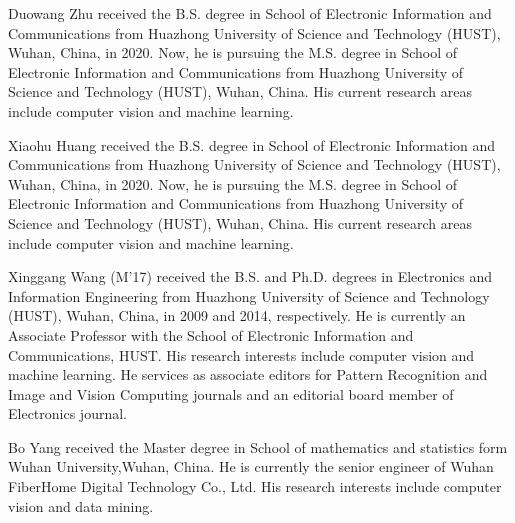 \documentclass[journal]{IEEEtran}
\begin{document}
{\small


}

\begin{IEEEbiography}{Duowang Zhu} received the B.S. degree in School of Electronic Information and Communications from Huazhong University of Science and Technology (HUST), Wuhan, China, in 2020. Now, he is pursuing the M.S. degree in School of Electronic Information and Communications from Huazhong University of Science and Technology (HUST), Wuhan, China. His current research areas include computer vision and machine learning.
\end{IEEEbiography}

\begin{IEEEbiography} {Xiaohu Huang} received the B.S. degree in School of Electronic Information and Communications from Huazhong University of Science and Technology (HUST), Wuhan, China, in 2020. Now, he is pursuing the M.S. degree in School of Electronic Information and Communications from Huazhong University of Science and Technology (HUST), Wuhan, China. His current research areas include computer vision and machine learning.
\end{IEEEbiography}

\begin{IEEEbiography} {Xinggang Wang (M’17)} received the B.S. and Ph.D. degrees in Electronics and Information Engineering from Huazhong University of Science and Technology (HUST), Wuhan, China, in 2009 and 2014, respectively. He is currently an Associate Professor with the School of Electronic Information and Communications, HUST. His research interests include computer vision and machine learning. He services as associate editors for Pattern Recognition and Image and Vision Computing journals and an editorial board member of Electronics journal.
\end{IEEEbiography}

\begin{IEEEbiography}{Bo Yang} received the Master degree in School of mathematics and statistics form Wuhan University,Wuhan, China. He is currently the senior engineer of Wuhan FiberHome Digital Technology Co., Ltd. His research interests include computer vision and data mining.
\end{IEEEbiography}
\end{document}

